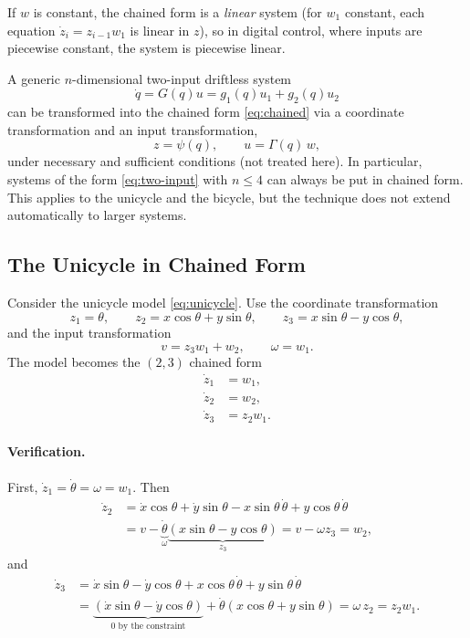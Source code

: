 If \( w \) is constant, the chained form is a \emph{linear} system (for
\( w_1 \) constant, each equation \( \dot z_i = z_{i-1} w_1 \) is linear
in \( z \)), so in digital control, where inputs are piecewise
constant, the system is piecewise linear.

A generic \( n \)-dimensional two-input driftless system
\begin{equation}
\label{eq:two-input}
    \dot{q} = G(q) u = g_1(q) u_1 + g_2(q) u_2
\end{equation}
can be transformed into the chained form \cref{eq:chained} via a
coordinate transformation and an input transformation,
\[
z = \psi(q), \qquad u = \Gamma(q)\, w,
\]
under necessary and sufficient conditions (not treated here). In
particular, systems of the form \cref{eq:two-input} with \( n \le 4 \)
can always be put in chained form. This applies to the unicycle and the
bicycle, but the technique does not extend automatically to larger
systems.

\subsection{The Unicycle in Chained Form}
\label{subsec:unicycle-chained}

Consider the unicycle model \cref{eq:unicycle}. Use the coordinate
transformation
\begin{equation}
\label{eq:chained-coord-transform}
z_1 = \theta, \qquad
z_2 = x\cos\theta + y\sin\theta, \qquad
z_3 = x\sin\theta - y\cos\theta,
\end{equation}
and the input transformation
\[
v = z_3 w_1 + w_2, \qquad \omega = w_1.
\]
The model becomes the \( (2,3) \) chained form
\begin{align}
    \dot{z}_1 &= w_1, \\
    \dot{z}_2 &= w_2, \\
    \dot{z}_3 &= z_2 w_1.
\end{align}

\paragraph{Verification.}
First, \( \dot z_1 = \dot\theta = \omega = w_1 \). Then
\begin{align}
    \dot{z}_2
    &= \dot{x} \cos\theta + \dot{y} \sin\theta
       - x \sin\theta\, \dot{\theta} + y \cos\theta\, \dot{\theta} \\
    &= v - \underbrace{\dot{\theta}}_{\omega}
       \underbrace{(x \sin\theta - y \cos\theta)}_{z_3}
     = v - \omega z_3 = w_2 ,
\end{align}
and
\begin{align}
    \dot{z}_3
    &= \dot{x} \sin\theta - \dot{y} \cos\theta
       + x \cos\theta\, \dot{\theta} + y \sin\theta\, \dot{\theta} \\
    &= \underbrace{(\dot{x} \sin\theta - \dot{y} \cos\theta)}_{0
       \text{ by the constraint}}
       + \dot{\theta} (x \cos\theta + y \sin\theta)
     = \omega\, z_2 = z_2 w_1 .
\end{align}

